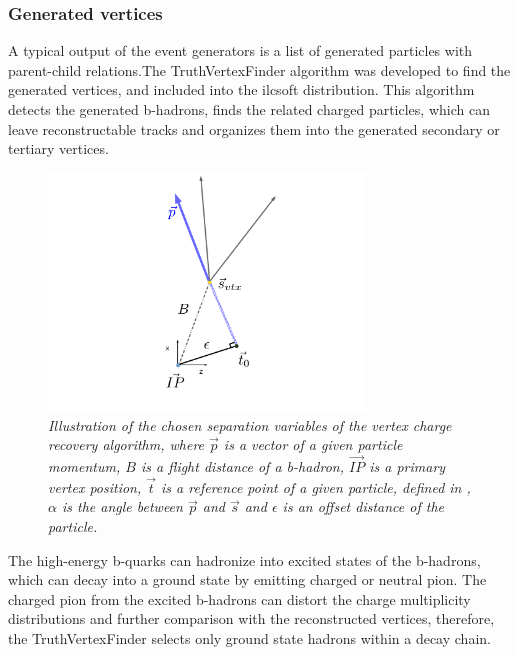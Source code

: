 \subsubsection{Generated vertices}
A typical output of the event generators is a list of generated particles with parent-child relations.The TruthVertexFinder algorithm was developed to find the generated vertices, and included into the {\sc ilcsoft} distribution. This algorithm detects the generated b-hadrons, finds the related charged particles, which can leave reconstructable tracks and organizes them into the generated secondary or tertiary vertices.
\begin{figure}[h]
	{\centering
		\includegraphics[width=0.75\textwidth]{ILD/plots/offset-graph.pdf}
		\caption{\sl Illustration of the chosen separation variables of the vertex charge recovery algorithm, where $\vec{p}$ is a vector of a given particle momentum, $B$ is a flight distance of a b-hadron, $\vec{IP}$ is a primary vertex position, $\vec{t}$ is a reference point of a given particle, defined in \cite{bib:LCIOtrack}, $\alpha$ is the angle between $\vec{p}$ and $\vec{s}$ and $\epsilon$ is an offset distance of the particle. %
		}
		\label{fig:VtxRecovery_3}
	}
\end{figure}





The high-energy b-quarks can hadronize into excited states of the b-hadrons, which can decay into a ground state by emitting charged or neutral pion. 
The charged pion from the excited b-hadrons can distort the charge multiplicity distributions and further comparison with the reconstructed vertices, therefore, the TruthVertexFinder selects only ground state hadrons within a decay chain. 

